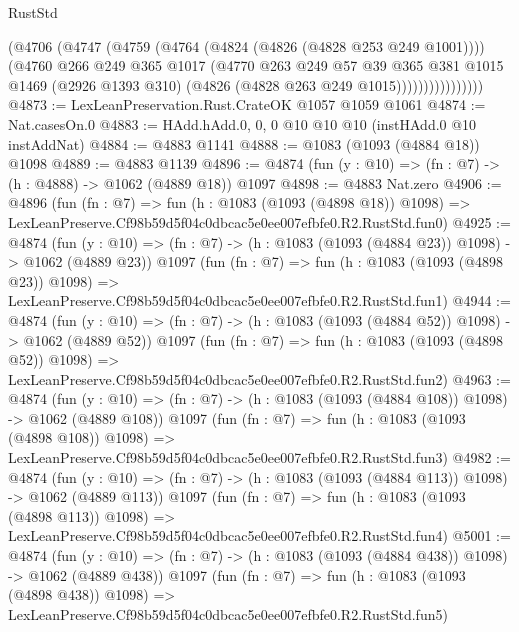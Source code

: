 \begin{lexlean}{RustStd}
\begin{coremodule}
                      (@4706
                        (@4747
                          (@4759
                            (@4764 (@4824 (@4826 (@4828 @253 @249 @1001))))
                            (@4760
                              @266
                              @249
                              @365
                              @1017
                              (@4770
                                @263
                                @249
                                @57
                                @39
                                @365
                                @381
                                @1015
                                @1469
                                (@2926 @1393 @310)
                                (@4826 (@4828 @263 @249 @1015))))))))))))))))
@4873 := LexLeanPreservation.Rust.CrateOK @1057 @1059 @1061
@4874 := Nat.casesOn.{0}
@4883 := HAdd.hAdd.{0, 0, 0} @10 @10 @10 (instHAdd.{0} @10 instAddNat)
@4884 := @4883 @1141
@4888 := @1083 (@1093 (@4884 @18)) @1098
@4889 := @4883 @1139
@4896 := @4874 (fun (y : @10) => (fn : @7) -> (h : @4888) -> @1062 (@4889 @18)) @1097
@4898 := @4883 Nat.zero
@4906 := @4896
    (fun (fn : @7) =>
    fun (h : @1083 (@1093 (@4898 @18)) @1098) =>
    LexLeanPreserve.Cf98b59d5f04c0dbcac5e0ee007efbfe0.R2.RustStd.fun0)
@4925 := @4874
    (fun (y : @10) => (fn : @7) -> (h : @1083 (@1093 (@4884 @23)) @1098) -> @1062 (@4889 @23))
    @1097
    (fun (fn : @7) =>
    fun (h : @1083 (@1093 (@4898 @23)) @1098) =>
    LexLeanPreserve.Cf98b59d5f04c0dbcac5e0ee007efbfe0.R2.RustStd.fun1)
@4944 := @4874
    (fun (y : @10) => (fn : @7) -> (h : @1083 (@1093 (@4884 @52)) @1098) -> @1062 (@4889 @52))
    @1097
    (fun (fn : @7) =>
    fun (h : @1083 (@1093 (@4898 @52)) @1098) =>
    LexLeanPreserve.Cf98b59d5f04c0dbcac5e0ee007efbfe0.R2.RustStd.fun2)
@4963 := @4874
    (fun (y : @10) => (fn : @7) -> (h : @1083 (@1093 (@4884 @108)) @1098) -> @1062 (@4889 @108))
    @1097
    (fun (fn : @7) =>
    fun (h : @1083 (@1093 (@4898 @108)) @1098) =>
    LexLeanPreserve.Cf98b59d5f04c0dbcac5e0ee007efbfe0.R2.RustStd.fun3)
@4982 := @4874
    (fun (y : @10) => (fn : @7) -> (h : @1083 (@1093 (@4884 @113)) @1098) -> @1062 (@4889 @113))
    @1097
    (fun (fn : @7) =>
    fun (h : @1083 (@1093 (@4898 @113)) @1098) =>
    LexLeanPreserve.Cf98b59d5f04c0dbcac5e0ee007efbfe0.R2.RustStd.fun4)
@5001 := @4874
    (fun (y : @10) => (fn : @7) -> (h : @1083 (@1093 (@4884 @438)) @1098) -> @1062 (@4889 @438))
    @1097
    (fun (fn : @7) =>
    fun (h : @1083 (@1093 (@4898 @438)) @1098) =>
    LexLeanPreserve.Cf98b59d5f04c0dbcac5e0ee007efbfe0.R2.RustStd.fun5)

\end{coremodule}
\end{lexlean}
